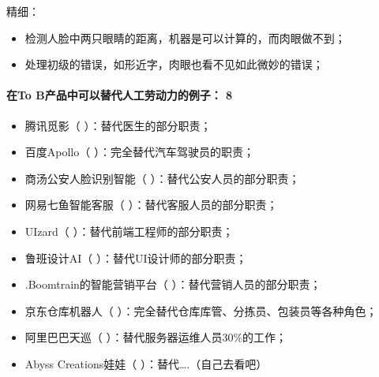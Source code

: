 \documentclass[letterpaper,11pt,english]{sphinxmanual}
\begin{document}
精细：
\begin{itemize}
\item {} 
检测人脸中两只眼睛的距离，机器是可以计算的，而肉眼做不到；

\item {} 
处理初级的错误，如形近字，肉眼也看不见如此微妙的错误；

\end{itemize}


\paragraph{在To B产品中可以替代人工劳动力的例子： 8\sphinxfootnotemark[196]}
\label{\detokenize{chapter_introduction/AI:to-b-8}}%
\begin{footnotetext}[196]\sphinxAtStartFootnote
{}
%
\end{footnotetext}\ignorespaces \begin{itemize}
\item {} 
腾讯觅影（ ）：替代医生的部分职责；

\item {} 
百度Apollo（ ）：完全替代汽车驾驶员的职责；

\item {} 
商汤\sphinxhyphen{}公安人脸识别智能（
）：替代公安人员的部分职责；

\item {} 
网易七鱼\sphinxhyphen{}智能客服（ ）：替代客服人员的部分职责；

\item {} 
UIzard（ ）：替代前端工程师的部分职责；

\item {} 
鲁班设计AI（ ）：替代UI设计师的部分职责；

\item {} 
.Boomtrain的智能营销平台（
）：替代营销人员的部分职责；

\item {} 
京东仓库机器人（
）：完全替代仓库库管、分拣员、包装员等各种角色；

\item {} 
阿里巴巴天巡（ ）：替代服务器运维人员30\%的工作；

\item {} 
Abyss Creations娃娃（ ）：替代….（自己去看吧）

\end{itemize}
\end{document}
